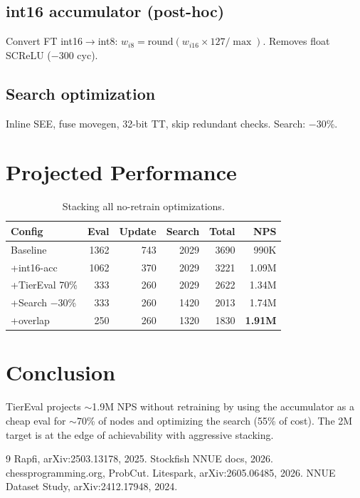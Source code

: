 \documentclass[conference]{IEEEtran}
\begin{document}
\subsection{int16 accumulator (post-hoc)}
Convert FT int16$\to$int8: $w_{i8} = \text{round}(w_{i16} \times 127/\max)$. Removes float SCReLU ($-$300 cyc).
\subsection{Search optimization}
Inline SEE, fuse movegen, 32-bit TT, skip redundant checks. Search: $-$30\%.
\section{Projected Performance}
\begin{table}[h]\centering\small\caption{Stacking all no-retrain optimizations.}
\begin{tabular}{lrrrrr}
\toprule
Config & Eval & Update & Search & Total & NPS \\\midrule
Baseline & 1362 & 743 & 2029 & 3690 & 990K \\
+int16-acc & 1062 & 370 & 2029 & 3221 & 1.09M \\
+TierEval 70\% & 333 & 260 & 2029 & 2622 & 1.34M \\
+Search $-$30\% & 333 & 260 & 1420 & 2013 & 1.74M \\
+overlap & 250 & 260 & 1320 & 1830 & \textbf{1.91M} \\\bottomrule
\end{tabular}\end{table}
\section{Conclusion}
TierEval projects $\sim$1.9M NPS without retraining by using the accumulator as a cheap eval for $\sim$70\% of nodes and optimizing the search (55\% of cost). The 2M target is at the edge of achievability with aggressive stacking.
\begin{thebibliography}{9}
 Rapfi, arXiv:2503.13178, 2025.
 Stockfish NNUE docs, 2026.
 chessprogramming.org, ProbCut.
 Litespark, arXiv:2605.06485, 2026.
 NNUE Dataset Study, arXiv:2412.17948, 2024.
\end{thebibliography}
\end{document}
